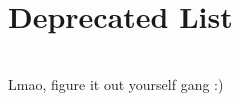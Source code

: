 \chapter{Deprecated List }
\hypertarget{deprecated}{}\label{deprecated}

\begin{DoxyRefList}
\item[{\parbox[t]{\linewidth}{Member \doxylink{classBrume_1_1Derived_aa3690918def3819cb9c8dcd4ac534bd5}{Brume::Derived::speak} (int volume) override}}]\hfill \\
\label{deprecated__deprecated000001}%
%
Lmao, figure it out yourself gang :)
\end{DoxyRefList}